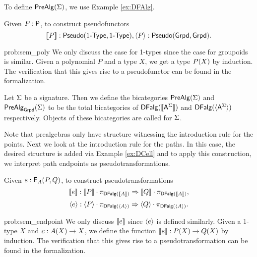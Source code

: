 To define $\prealg{\sign}$, we use Example \ref{ex:DFAlg}.

\begin{problem}
\label{prob:sem_poly}
Given $P : \poly$, to construct pseudofunctors
\[
\semP{P} : \pseudo(\onetypes, \onetypes), 
\semPG{P} : \pseudo(\grpd, \grpd).
\]
\end{problem}

\begin{construction}{prob:sem_poly}
We only discuss the case for 1-types since the case for groupoids is similar.
Given a polynomial $P$ and a type $X$, we get a type $\polyAct{P}{X}$ by induction.
The verification that this gives rise to a pseudofunctor can be found in the formalization.
\end{construction}

\begin{definition}
\label{def:prealg}
Let $\sign$ be a signature.
Then we define the bicategories $\prealg{\sign}$ and $\prealgG{\sign}$
to be the total bicategories of $\DFAlg(\semP{\pointconstr[\sign]})$
and $\DFAlg(\semPG{\pointconstr[\sign]})$ respectively.
Objects of these bicategories are called  for $\sign$.
\end{definition}

Note that prealgebras only have structure witnessing the introduction rule for the points.
Next we look at the introduction rule for the paths.
In this case, the desired structure is added via Example \ref{ex:DCell} and to apply this construction,
we interpret path endpoints as pseudotransformations.

\begin{problem}
\label{prob:sem_endpoint}
Given $e : \pathendpoint{A}{P}{Q}$, to construct pseudotransformations
\[
\semE{e} : \pstrans{\semP{P} \cdot \dproj{\DFAlg(\semP{A})}}{\semP{Q} \cdot \dproj{\DFAlg(\semP{A})}},
\]
\[
\semEG{e} : \pstrans{\semPG{P} \cdot \dproj{\DFAlg(\semPG{A})}}{\semPG{Q} \cdot \dproj{\DFAlg(\semPG{A})}}.
\]
\end{problem}

\begin{construction}{prob:sem_endpoint}
We only discuss $\semE{e}$ since $\semEG{e}$ is defined similarly.
Given a 1-type $X$ and $c : \polyAct{A}{X} \rightarrow X$, we define the function
$\semE{e} : \polyAct{P}{X} \rightarrow \polyAct{Q}{X}$ by induction.
The verification that this gives rise to a pseudotransformation can be found in the formalization.
\end{construction}

